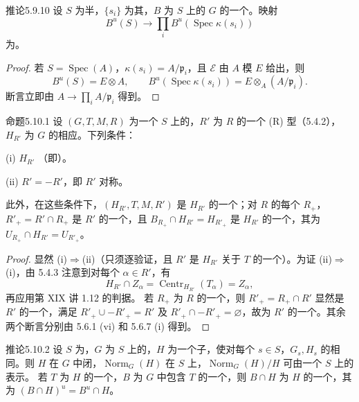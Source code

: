 \begin{SGAresult}{推论}{5.9.10}
设 $S$ 为半，$\{s_i\}$ 为其，$B$ 为 $S$ 上的 $G$ 的一个。映射
\[B^u(S)\longrightarrow\prod_i B^u(\operatorname{Spec}\kappa(s_i))\]
为。
\end{SGAresult}
\begin{proof}
若 $S=\operatorname{Spec}(A)$，$\kappa(s_i)=A/\mathfrak p_i$，且 $\mathcal E$ 由 $A$ 模 $E$ 给出，则
\[B^u(S)=E\otimes A,\qquad B^u(\operatorname{Spec}\kappa(s_i))=E\otimes_A(A/\mathfrak p_i).\]
断言立即由 $A\to\prod_iA/\mathfrak p_i$ 得到。
\end{proof}
\begin{SGAresult}{命题}{5.10.1}
设 $(G,T,M,R)$ 为一个 $S$ 上的，$R'$ 为 $R$ 的一个 (R) 型（5.4.2），$H_{R'}$ 为 $G$ 的相应。下列条件：

(i) $H_{R'}$ （即）。

(ii) $R'=-R'$，即 $R'$ 对称。

此外，在这些条件下，$(H_{R'},T,M,R')$ 是 $H_{R'}$ 的一个；对 $R$ 的每个 $R_+$，$R'_+=R'\cap R_+$ 是 $R'$ 的一个，且 $B_{R_+}\cap H_{R'}=H_{R'_+}$ 是 $H_{R'}$ 的一个，其为 $U_{R_+}\cap H_{R'}=U_{R'_+}$。
\end{SGAresult}
\begin{proof}
显然 (i)$\Rightarrow$(ii)（只须逐验证，且 $R'$ 是 $H_{R'}$ 关于 $T$ 的一个）。为证 (ii)$\Rightarrow$(i)，由 5.4.3 注意到对每个 $\alpha\in R'$，有
\[H_{R'}\cap Z_\alpha=\operatorname{Centr}_{H_{R'}}(T_\alpha)=Z_\alpha,\]
再应用第 XIX 讲 1.12 的判据。
若 $R_+$ 为 $R$ 的一个，则 $R'_+=R_+\cap R'$ 显然是 $R'$ 的一个，满足 $R'_+\cup-R'_+=R'$ 及 $R'_+\cap-R'_+=\varnothing$，故为 $R'$ 的一个。其余两个断言分别由 5.6.1 (vi) 和 5.6.7 (i) 得到。
\end{proof}
\begin{SGAresult}{推论}{5.10.2}
设 $S$ 为，$G$ 为 $S$ 上的，$H$ 为一个子，使对每个 $s\in S$，$G_s,H_s$ 的相同。则 $H$ 在 $G$ 中闭，$\operatorname{Norm}_G(H)$ 在 $S$ 上，$\operatorname{Norm}_G(H)/H$ 可由一个 $S$ 上的表示。
若 $T$ 为 $H$ 的一个，$B$ 为 $G$ 中包含 $T$ 的一个，则 $B\cap H$ 为 $H$ 的一个，其为 $(B\cap H)^u=B^u\cap H$。
\end{SGAresult}
